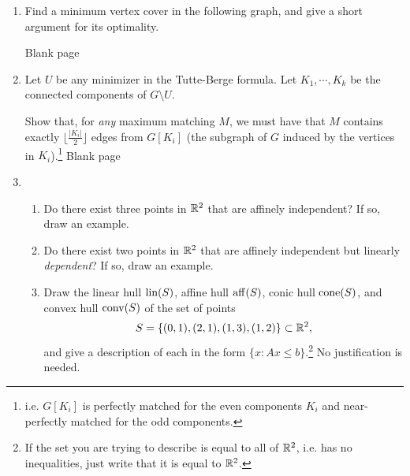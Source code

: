 \documentclass[12pt]{article}
\begin{document}
\begin{enumerate}
\item Find a minimum vertex cover in the following
graph, and give a short argument for its optimality. 


\begin{center}
\end{center}
\newpage
Blank page 
\newpage

\item 
Let $U$ be any minimizer in the Tutte-Berge formula. Let $K_1,
  \cdots, K_k$ be the connected components of $G\setminus U$.  
  
Show
  that, for {\it any} maximum matching $M$, we must have that $M$ contains exactly $\lfloor \frac{|K_i|}{2}\rfloor$ edges from
$G[K_i]$ (the subgraph of $G$ induced by the vertices in
$K_i$).\footnote{ i.e. $G[K_i]$ is perfectly matched for the even components $K_i$ and
near-perfectly matched for the odd components. }
\newpage
Blank page
\newpage

\item 
\begin{enumerate}
\item Do there exist three points in ${\mathbb R}^2$ that are affinely independent? If so, draw an example.
\item Do there exist two points in ${\mathbb R}^2$ that are affinely independent but linearly \emph{dependent}? If so, draw an example.
\item Draw the linear hull $\operatorname{lin}(S)$, affine hull $\operatorname{aff}(S)$, conic hull $\operatorname{cone}(S)$, and convex hull $\operatorname{conv}(S)$ of the set of points 
$$S  = \{(0,1), (2,1), (1,3), (1,2) \} \subset {\mathbb R}^2,$$
and give a description of each in the form $\{x: Ax \leq b\}$.\footnote{If the set you are trying to describe is equal to all of ${\mathbb R}^2$, i.e. has no inequalities, just write that it is equal to ${\mathbb R}^2$.} No justification is needed.
\end{enumerate}


\end{enumerate}
\end{document}

